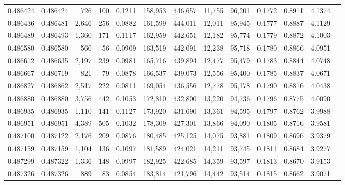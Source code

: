 \begin{tabular}{rrrrrrrrrrrrr}
0.486424 & 0.486424 &   726 &   100 &                                     0.1211 & 158,953 & 446,657 &  11,755 &  96,201 & 0.1772 & 0.8911 & 4.1374 \\
0.486436 & 0.486481 & 2,646 &   256 &                                     0.0882 & 161,599 & 444,011 &  12,011 &  95,945 & 0.1777 & 0.8887 & 4.1129 \\
0.486489 & 0.486493 & 1,360 &   171 &                                     0.1117 & 162,959 & 442,651 &  12,182 &  95,774 & 0.1779 & 0.8872 & 4.1003 \\
0.486580 & 0.486580 &   560 &    56 &                                     0.0909 & 163,519 & 442,091 &  12,238 &  95,718 & 0.1780 & 0.8866 & 4.0951 \\
0.486612 & 0.486635 & 2,197 &   239 &                                     0.0981 & 165,716 & 439,894 &  12,477 &  95,479 & 0.1783 & 0.8844 & 4.0748 \\
0.486667 & 0.486719 &   821 &    79 &                                     0.0878 & 166,537 & 439,073 &  12,556 &  95,400 & 0.1785 & 0.8837 & 4.0671 \\
0.486827 & 0.486862 & 2,517 &   222 &                                     0.0811 & 169,054 & 436,556 &  12,778 &  95,178 & 0.1790 & 0.8816 & 4.0438 \\
0.486880 & 0.486880 & 3,756 &   442 &                                     0.1053 & 172,810 & 432,800 &  13,220 &  94,736 & 0.1796 & 0.8775 & 4.0090 \\
0.486935 & 0.486935 & 1,110 &   141 &                                     0.1127 & 173,920 & 431,690 &  13,361 &  94,595 & 0.1797 & 0.8762 & 3.9988 \\
0.486951 & 0.486951 & 4,389 &   505 &                                     0.1032 & 178,309 & 427,301 &  13,866 &  94,090 & 0.1805 & 0.8716 & 3.9581 \\
0.487100 & 0.487122 & 2,176 &   209 &                                     0.0876 & 180,485 & 425,125 &  14,075 &  93,881 & 0.1809 & 0.8696 & 3.9379 \\
0.487159 & 0.487159 & 1,104 &   136 &                                     0.1097 & 181,589 & 424,021 &  14,211 &  93,745 & 0.1811 & 0.8684 & 3.9277 \\
0.487299 & 0.487322 & 1,336 &   148 &                                     0.0997 & 182,925 & 422,685 &  14,359 &  93,597 & 0.1813 & 0.8670 & 3.9153 \\
0.487326 & 0.487326 &   889 &    83 &                                     0.0854 & 183,814 & 421,796 &  14,442 &  93,514 & 0.1815 & 0.8662 & 3.9071 \\

\end{tabular}
